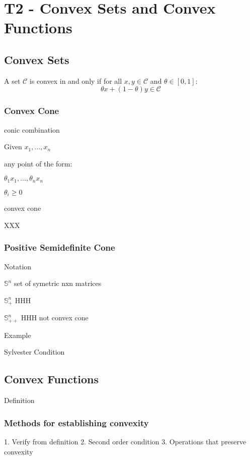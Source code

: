 \section{T2 - Convex Sets and Convex Functions}

\subsection{Convex Sets}

\begin{definition}[conv]
	A set $\mathcal{C}$ is convex in and only if for all
	$x,y \in \mathcal{C}$ and $\theta \in [0,1]$:
	$$\theta x + (1-\theta)y \in \mathcal{C}$$
\end{definition}
\subsubsection{Convex Cone}

conic combination

Given $x_1,...,x_n$

any point of the form:

$\theta_1 x_1,...,\theta_n x_n$

$\theta_i \ge 0$

convex cone

XXX

\subsubsection{Positive Semidefinite Cone}

Notation

$\mathbb{S}^n$ set of symetric nxn matrices

$\mathbb{S}_+^n$ HHH

$\mathbb{S}_{++}^n$ HHH not convex cone

Example

Sylvester Condition

\subsection{Convex Functions}

Definition

\subsubsection{Methods for establishing convexity}

1. Verify from definition
2. Second order condition
3. Operations that preserve convexity

